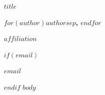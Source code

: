 \documentclass[10pt,a4paper]{article}
\begin{document}
{\raggedright\Large\bfseries $title$\par}
\vspace{0.4em}
{\normalsize\bfseries $for(author)$$author$$sep$, $endfor$\par}
{\small $affiliation$\par}
$if(email)$
{\small\href{mailto:$email$}{$email$}\par}
$endif$
\vspace{0.6em}
$body$
\end{document}
